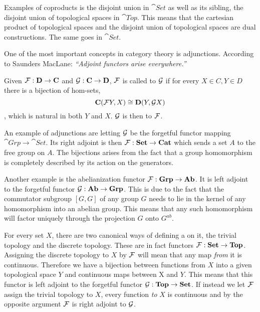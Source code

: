 \documentclass[../../main.tex]{subfiles}
\begin{document}
    
    Examples of coproducts is the disjoint union in $\cat{Set}$ as well as its sibling, the disjoint union of topological spaces in $\cat{Top}$. This means that the cartesian product of topological spaces and the disjoint union of topological spaces are dual constructions. The same goes in $\cat{Set}$.
    
    One of the most important concepts in category theory is adjunctions. According to Saunders MacLane: \textit{“Adjoint functors arise everywhere.”}
    
    \begin{definition}
        Given $\mathcal{F}: \mathbf{D} \to \mathbf{C}$ and $\mathcal{G}: \mathbf{C} \to \mathbf{D}$, $\mathcal{F}$ is called  to $\mathcal{G}$ if for every $X \in C, Y \in D$ there is a bijection of hom-sets, $$\mathbf{C}(\mathcal{F}Y, X) \cong \mathbf{D}(Y, \mathcal{G}X)$$, which is natural in both $Y$ and $X$. $\mathcal{G}$ is then  to $\mathcal{F}$.
    \end{definition}
    
    An example of adjunctions are letting $\mathcal{G}$ be the forgetful functor mapping $\cat{Grp} \to \cat{Set}$. Its right adjoint is then $\mathcal{F}: \mathbf{Set} \to \mathbf{Cat}$ which sends a set $A$ to the free group on $A$. The bijections arises from the fact that a group homomorphism is completely described by its action on the generators.
    
    Another example is the abelianization functor $\mathcal{F}: \mathbf{Grp} \to \mathbf{Ab}$. It is left adjoint to the forgetful functor $\mathcal{G}: \mathbf{Ab} \to \mathbf{Grp}$. This is due to the fact that the commutator subgroup $[G, G]$ of any group $G$ needs to lie in the kernel of any homomorphism into an abelian group. This means that any such homomorphism will factor uniquely through the projection $G$ onto $G^{ab}$.
    
    For every set $X$, there are two canonical ways of defining a on it, the trivial topology and the discrete topology. These are in fact functors $\mathcal{F}: \mathbf{Set} \to \mathbf{Top}$. Assigning the discrete topology to $X$ by $\mathcal{F}$ will mean that any map \emph{from} it is continuous. Therefore we have a bijection between functions from $X$ into a given topological space $Y$ and continuous maps between X and $Y$. This means that this functor is left adjoint to the forgetful functor $\mathcal{G}: \mathbf{Top} \to \mathbf{Set}$. If instead we let $\mathcal{F}$ assign the trivial topology to $X$, every function \emph{to} $X$ is continuous and by the opposite argument $\mathcal{F}$ is right adjoint to $\mathcal{G}$.
    
\end{document}
